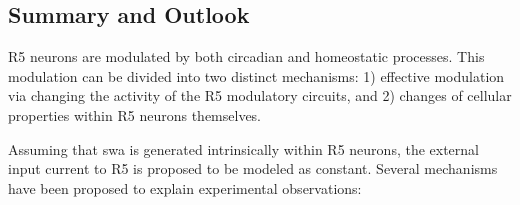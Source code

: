 \documentclass[../main.tex]{subfiles}
\begin{document}
\subsection{Summary and Outlook}

R5 neurons are modulated by both circadian and homeostatic processes. This modulation can be divided into two distinct mechanisms: 1) effective modulation via changing the activity of the R5 modulatory circuits, and 2) changes of cellular properties within R5 neurons themselves.

Assuming that \gls{swa} is generated intrinsically within R5 neurons, the external input current to R5 is proposed to be modeled as constant.
Several mechanisms have been proposed to explain experimental observations:
\end{document}
